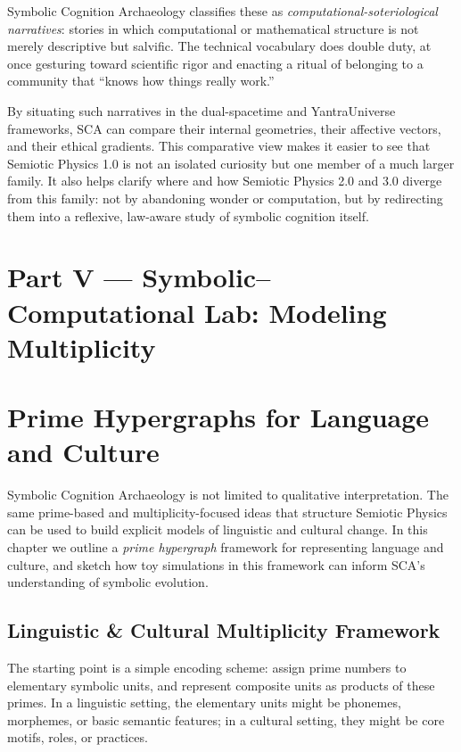 \documentclass[12]{amsart}
\theoremstyle{plain}
\begin{document}
Symbolic Cognition Archaeology classifies these as \emph{computational-soteriological narratives}: stories in which computational or mathematical structure is not merely descriptive but salvific. The technical vocabulary does double duty, at once gesturing toward scientific rigor and enacting a ritual of belonging to a community that ``knows how things really work.''

By situating such narratives in the dual-spacetime and YantraUniverse frameworks, SCA can compare their internal geometries, their affective vectors, and their ethical gradients. This comparative view makes it easier to see that Semiotic Physics 1.0 is not an isolated curiosity but one member of a much larger family. It also helps clarify where and how Semiotic Physics 2.0 and 3.0 diverge from this family: not by abandoning wonder or computation, but by redirecting them into a reflexive, law-aware study of symbolic cognition itself.


\section*{Part V — Symbolic–Computational Lab: Modeling Multiplicity}

\section{Prime Hypergraphs for Language and Culture}

Symbolic Cognition Archaeology is not limited to qualitative interpretation. The same prime-based and multiplicity-focused ideas that structure Semiotic Physics can be used to build explicit models of linguistic and cultural change. In this chapter we outline a \emph{prime hypergraph} framework for representing language and culture, and sketch how toy simulations in this framework can inform SCA's understanding of symbolic evolution.

\subsection{Linguistic \& Cultural Multiplicity Framework}

The starting point is a simple encoding scheme: assign prime numbers to elementary symbolic units, and represent composite units as products of these primes. In a linguistic setting, the elementary units might be phonemes, morphemes, or basic semantic features; in a cultural setting, they might be core motifs, roles, or practices.
\end{document}
